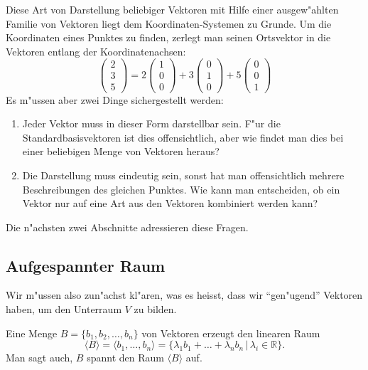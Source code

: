Diese Art von Darstellung beliebiger Vektoren mit Hilfe einer
ausgew"ahlten Familie von Vektoren liegt dem Koordinaten-Systemen
zu Grunde.
Um die Koordinaten eines Punktes zu finden, zerlegt
man seinen Ortsvektor in die Vektoren entlang der Koordinatenachsen:
\[
\begin{pmatrix}2\\3\\5\end{pmatrix}
=
2\begin{pmatrix}1\\0\\0\end{pmatrix}+
3\begin{pmatrix}0\\1\\0\end{pmatrix}+
5\begin{pmatrix}0\\0\\1\end{pmatrix}
\]
Es m"ussen aber zwei Dinge sichergestellt werden:
\begin{enumerate}
\item Jeder Vektor muss in dieser Form darstellbar sein.
F"ur die
Standardbasisvektoren ist dies offensichtlich, aber wie findet man
dies bei einer beliebigen Menge von Vektoren heraus?
\item Die Darstellung muss eindeutig sein, sonst hat man offensichtlich
mehrere Beschreibungen des gleichen Punktes.
Wie kann man entscheiden,
ob ein Vektor nur auf eine Art aus den Vektoren kombiniert werden kann?
\end{enumerate}
Die n"achsten zwei Abschnitte adressieren diese Fragen.

\subsection{Aufgespannter Raum}
Wir m"ussen also zun"achst kl"aren, was es heisst, dass wir ``gen"ugend''
Vektoren haben, um den Unterraum $V$ zu bilden.

\begin{definition}
Eine Menge $B=\{b_1,b_2,\dots,b_n\}$ von Vektoren erzeugt den
linearen Raum
\[
\langle B\rangle =
\langle b_1,\dots , b_n\rangle =
\{\lambda_1b_1+\dots+\lambda_nb_n\,|\,\lambda_i\in\mathbb R\}.
\]
Man sagt auch, $B$ spannt den Raum $\langle B\rangle$ auf.
\end{definition}

